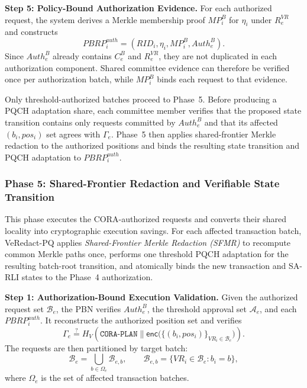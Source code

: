 \documentclass[lettersize,journal]{IEEEtran}
\begin{document}
\medskip
\noindent\textbf{Step 5: Policy-Bound Authorization Evidence.}
For each authorized request, the system derives a Merkle membership
proof $MP_i^{B}$ for $\eta_i$ under $R_e^{VR}$ and constructs
\begin{equation}
PBRP_i^{auth}
=
(RID_i,\eta_i,MP_i^{B},Auth_e^{B}).
\end{equation}
Since $Auth_e^{B}$ already contains $C_e^{B}$ and $R_e^{VR}$, they are
not duplicated in each authorization component. Shared committee
evidence can therefore be verified once per authorization batch, while
$MP_i^{B}$ binds each request to that evidence.

Only threshold-authorized batches proceed to Phase~5. Before producing
a PQCH adaptation share, each committee member verifies that the
proposed state transition contains only requests committed by
$Auth_e^{B}$ and that its affected $(b_i,pos_i)$ set agrees with
$\Gamma_e$. Phase~5 then applies shared-frontier Merkle redaction to the
authorized positions and binds the resulting state transition and PQCH
adaptation to $PBRP_i^{auth}$.
    
 \subsubsection*{\textbf{Phase 5: Shared-Frontier Redaction and
Verifiable State Transition}}

This phase executes the CORA-authorized requests and converts their
shared locality into cryptographic execution savings. For each affected
transaction batch, VeRedact-PQ applies \emph{Shared-Frontier Merkle
Redaction (SFMR)} to recompute common Merkle paths once, performs one
threshold PQCH adaptation for the resulting batch-root transition, and
atomically binds the new transaction and SA-RLI states to the Phase~4
authorization.

\medskip
\noindent\textbf{Step 1: Authorization-Bound Execution Validation.}
Given the authorized request set $\mathcal{B}_e$, the PBN verifies
$Auth_e^B$, the threshold approval set $\mathcal{A}_e$, and each
$PBRP_i^{auth}$. It reconstructs the authorized position set and verifies
\begin{equation}
\Gamma_e
\stackrel{?}{=}
H_V\!\left(
\texttt{CORA-PLAN}\parallel
\mathsf{enc}\big(\{(b_i,pos_i)\}_{VR_i\in\mathcal{B}_e}\big)
\right).
\end{equation}
The requests are then partitioned by target batch:
\begin{equation}
\mathcal{B}_e
=
\bigcup_{b\in\Omega_e}\mathcal{B}_{e,b},
\qquad
\mathcal{B}_{e,b}
=
\{VR_i\in\mathcal{B}_e:b_i=b\},
\end{equation}
where $\Omega_e$ is the set of affected transaction batches.
\end{document}
